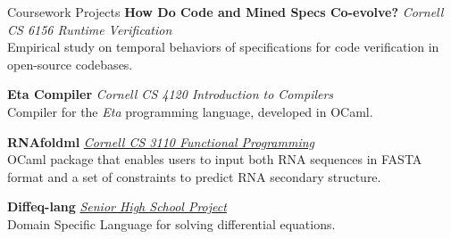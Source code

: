  
\begin{rSection}{Coursework Projects}
	\textbf{How Do Code and Mined Specs Co-evolve?} \textit{Cornell CS 6156 Runtime Verification} \\
	Empirical study on temporal behaviors of specifications for code verification in open-source codebases.

	\textbf{Eta Compiler} \textit{Cornell CS 4120 Introduction to Compilers} \\
	Compiler for the \textit{Eta} programming language, developed in OCaml. 

	\textbf{RNAfoldml} \href{https://github.com/jpVinnie/RNAfoldml/}{\textit{Cornell CS 3110 Functional Programming} \ExternalLink} \\
	OCaml package that enables users to input both RNA sequences in FASTA format and a set of constraints to predict RNA secondary structure.

	\textbf{Diffeq-lang} \href{https://github.com/jpVinnie/diffeq-lang/}{\textit{Senior High School Project} \ExternalLink} \\
	Domain Specific Language for solving differential equations.

\end{rSection}